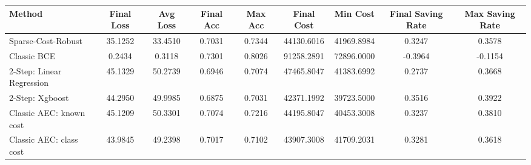 \begin{tabular}{lcccccccc}
\toprule
Method & Final Loss & Avg Loss & Final Acc & Max Acc & Final Cost & Min Cost & Final Saving Rate & Max Saving Rate \\
\midrule
Sparse-Cost-Robust & 35.1252 & 33.4510 & 0.7031 & 0.7344 & 44130.6016 & 41969.8984 & 0.3247 & 0.3578 \\
Classic BCE & 0.2434 & 0.3118 & 0.7301 & 0.8026 & 91258.2891 & 72896.0000 & -0.3964 & -0.1154 \\
2-Step: Linear Regression & 45.1329 & 50.2739 & 0.6946 & 0.7074 & 47465.8047 & 41383.6992 & 0.2737 & 0.3668 \\
2-Step: Xgboost & 44.2950 & 49.9985 & 0.6875 & 0.7031 & 42371.1992 & 39723.5000 & 0.3516 & 0.3922 \\
Classic AEC: known cost & 45.1209 & 50.3301 & 0.7074 & 0.7216 & 44195.8047 & 40453.3008 & 0.3237 & 0.3810 \\
Classic AEC: class cost & 43.9845 & 49.2398 & 0.7017 & 0.7102 & 43907.3008 & 41709.2031 & 0.3281 & 0.3618 \\
\bottomrule
\end{tabular}
